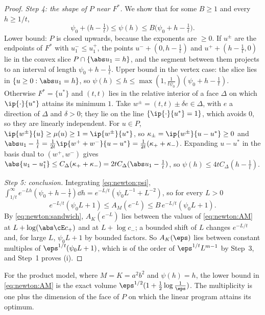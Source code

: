 \begin{refsection}
\begin{proof}
\emph{Step 4: the shape of $P$ near $F^*$.} We show that for some $B\ge1$ and every $h\ge1/t$,
\begin{equation}\label{eq:newton:psi}
\psi_0+\bigl(h-\tfrac1t\bigr)\le\psi(h)\le B\bigl(\psi_0+h-\tfrac1t\bigr).
\end{equation}
Lower bound: $P$ is closed upwards, because the exponents are $\ge0$. If $u^\pm$ are the endpoints of $F^*$ with $u^-_1\le u^+_1$, the points $u^-+(0,h-\frac1t)$ and $u^++(h-\frac1t,0)$ lie in the convex slice $P\cap\{\abs u_1=h\}$, and the segment between them projects to an interval of length $\psi_0+h-\frac1t$. Upper bound in the vertex case: the slice lies in $\{u\ge0:\abs u_1=h\}$, so $\psi(h)\le h\le\max(1,\frac1{t\psi_0})(\psi_0+h-\frac1t)$. Otherwise $F^*=\{u^*\}$ and $(t,t)$ lies in the relative interior of a face $\Delta$ on which $\ip{\cdot}{u^*}$ attains its minimum $1$. Take $w^\pm=(t,t)\pm\delta e\in\Delta$, with $e$ a direction of $\Delta$ and $\delta>0$; they lie on the line $\{\ip{\cdot}{u^*}=1\}$, which avoids $0$, so they are linearly independent. For $u\in P$, $\ip{w^\pm}{u}\ge\mu(u)\ge1=\ip{w^\pm}{u^*}$, so $\kappa_\pm=\ip{w^\pm}{u-u^*}\ge0$ and $\abs u_1-\frac1t=\frac1{2t}\ip{w^++w^-}{u-u^*}=\frac1{2t}(\kappa_++\kappa_-)$. Expanding $u-u^*$ in the basis dual to $(w^+,w^-)$ gives $\abs{u_1-u_1^*}\le C_\Delta(\kappa_++\kappa_-)=2tC_\Delta(\abs u_1-\frac1t)$, so $\psi(h)\le4tC_\Delta(h-\frac1t)$.

\emph{Step 5: conclusion.} Integrating \eqref{eq:newton:psi}, $\int_{1/t}^\infty e^{-Lh}(\psi_0+h-\frac1t)\dd h=e^{-L/t}(\psi_0L^{-1}+L^{-2})$, so for every $L>0$
\begin{equation}\label{eq:newton:AM}
e^{-L/t}(\psi_0L+1)\le A_M(e^{-L})\le B\,e^{-L/t}(\psi_0L+1).
\end{equation}
By \eqref{eq:newton:sandwich}, $A_K(e^{-L})$ lies between the values of \eqref{eq:newton:AM} at $L+\log(\abs\cE c_+)$ and at $L+\log c_-$; a bounded shift of $L$ changes $e^{-L/t}$ and, for large $L$, $\psi_0L+1$ by bounded factors. So $A_K(\eps)$ lies between constant multiples of $\eps^{1/t}(\psi_0L+1)$, which is of the order of $\eps^{1/t}L^{m-1}$ by Step~3, and Step~1 proves (i).
\end{proof}

For the product model, where $M=K=a^2b^2$ and $\psi(h)=h$, the lower bound in \eqref{eq:newton:AM} is the exact volume $\eps^{1/2}(1+\frac12\log\frac1\eps)$. The multiplicity is one plus the dimension of the face of $P$ on which the linear program attains its optimum.


\end{refsection}
